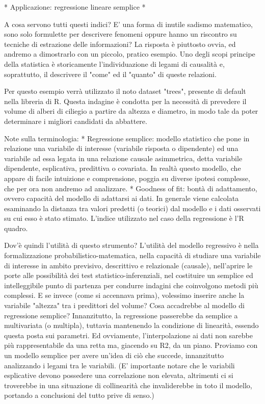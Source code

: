 \documentclass{book}
\begin{document}
	* Applicazione: regressione lineare semplice *

A cosa servono tutti questi indici? E' una forma di inutile sadismo matematico, sono solo formulette per descrivere fenomeni oppure hanno un riscontro su tecniche di estrazione delle informazioni? La risposta \`{e} piuttosto ovvia, ed andremo a dimostrarlo con un piccolo, pratico esempio.
Uno degli scopi principe della statistica \`{e} storicamente l'individuazione di legami di causalit\`{a} e, soprattutto, il descrivere il "come" ed il "quanto" di queste relazioni.

Per questo esempio verr\`{a} utilizzato il noto dataset "trees", presente di default nella libreria di R. Questa indagine \`{e} condotta per la necessit\`{a} di prevedere il volume di alberi di ciliegio a partire da altezza e diametro, in modo tale da poter determinare i migliori candidati da abbattere.

Note sulla terminologia:
* Regressione semplice: modello statistico che pone in relazione una variabile di interesse (variabile risposta o dipendente) ed una variabile ad essa legata in una relazione causale asimmetrica, detta variabile dipendente, esplicativa, predittiva o covariata. In realt\`{a} questo modello, che appare di facile intuizione e comprensione, poggia su diverse ipotesi complesse, che per ora non andremo ad analizzare.
* Goodness of fit: bont\`{a} di adattamento, ovvero capacit\`{a} del modello di adattarsi ai dati. In generale viene calcolata esaminando la distanza tra valori predetti (o teorici) dal modello e i dati osservati su cui esso \`{e} stato stimato. L'indice utilizzato nel caso della regressione \`{e} l'R quadro.




Dov'\`{e} quindi l'utilit\`{a} di questo strumento? L'utilit\`{a} del modello regressivo \`{e} nella formalizzazione probabilistico-matematica, nella capacit\`{a} di studiare una variabile di interesse in ambito previsivo, descrittivo e relazionale (causale), nell'aprire le porte alle possibilit\`{a} dei test statistico-inferenziali, nel costituire un semplice ed intelleggibile punto di partenza per condurre indagini che coinvolgono metodi più complessi.
E se invece (come si accennava prima), volessimo inserire anche la variabile "altezza" tra i predittori del volume? Cosa accadrebbe al modello di regressione semplice?
Innanzitutto, la regressione passerebbe da semplice a multivariata (o multipla), tuttavia mantenendo la condizione di linearit\`{a}, essendo questa posta sui parametri. Ed ovviamente, l'interpolazione ai dati non sarebbe più rappresentabile da una retta ma, giacendo su R2, da un piano.
Proviamo con un modello semplice per avere un'idea di ciò che succede, innanzitutto analizzando i legami tra le variabili. (E' importante notare che le variabili esplicative devono possedere una correlazione non elevata, altrimenti ci si troverebbe in una situazione di collinearit\`{a} che invaliderebbe in toto il modello, portando a conclusioni del tutto prive di senso.)
\end{document}
